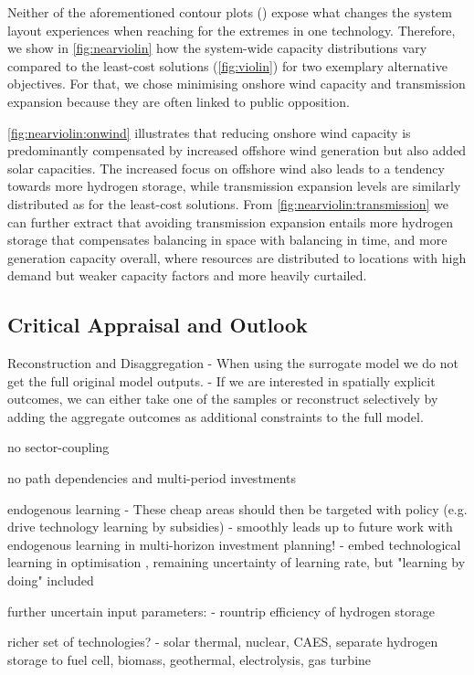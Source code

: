Neither of the aforementioned contour plots () expose
what changes the system layout experiences when reaching for the extremes in one technology.
Therefore, we show in \cref{fig:nearviolin} how the system-wide capacity distributions vary 
compared to the least-cost solutions (\cref{fig:violin}) for two exemplary alternative objectives.
For that, we chose minimising onshore wind capacity and transmission expansion
because they are often linked to public opposition.

\cref{fig:nearviolin:onwind} illustrates that reducing onshore wind capacity is
predominantly compensated by increased offshore wind generation but also added solar capacities.
The increased focus on offshore wind also leads to a tendency towards more hydrogen storage,
while transmission expansion levels are similarly distributed as for the least-cost solutions.
From \cref{fig:nearviolin:transmission} we can further extract that avoiding transmission expansion entails
more hydrogen storage that compensates balancing in space with balancing in time,
and more generation capacity overall, where resources are distributed to locations with
high demand but weaker capacity factors and more heavily curtailed.

\subsection{Critical Appraisal and Outlook}

Reconstruction and Disaggregation
- When using the surrogate model we do not get the full original model outputs.
- If we are interested in spatially explicit outcomes, we can either take one of the samples
or reconstruct selectively by adding the aggregate outcomes as additional constraints to the full model.

no sector-coupling

no path dependencies and multi-period investments

endogenous learning
- These cheap areas should then be targeted with policy (e.g. drive technology learning by subsidies)
- smoothly leads up to future work with endogenous learning in multi-horizon investment planning!
- embed technological learning in optimisation \cite{heuberger_power_2017} \cite{lopion_cost_2019}, remaining uncertainty of learning rate, but "learning by doing" included

further uncertain input parameters:
- rountrip efficiency of hydrogen storage

richer set of technologies?
- solar thermal, nuclear, CAES, separate hydrogen storage to fuel cell, biomass, geothermal, electrolysis, gas turbine
